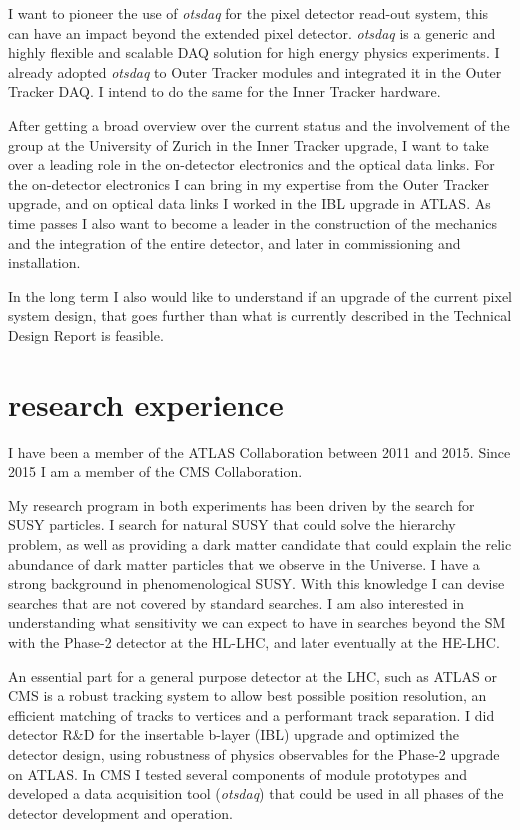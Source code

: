 \documentclass[]{cv} %
\begin{document}
\begin{statement}
I want to pioneer the use of \textit{otsdaq} for the pixel detector read-out
system, this can have an impact beyond the extended pixel detector.
\textit{otsdaq} is a generic and highly flexible and scalable DAQ solution for
high energy physics experiments. I already adopted \textit{otsdaq} to Outer
Tracker modules and integrated it in the Outer Tracker DAQ. I intend to do the
same for the Inner Tracker hardware.

After getting a broad overview over the current status and the involvement of
the group at the University of Zurich in the Inner Tracker upgrade, I want to
take over a leading role in the on-detector electronics and the optical data
links. For the on-detector electronics I can bring in my expertise from the
Outer Tracker upgrade, and on optical data links I worked in the IBL upgrade in
ATLAS. As time passes I also want to become a leader in the construction of the
mechanics and the integration of the entire detector, and later in commissioning
and installation.

In the long term I also would like to understand if an upgrade of the current
pixel system design, that goes further than what is currently described in the
Technical Design Report is feasible.

\section{research experience}

I have been a member of the ATLAS Collaboration between 2011 and 2015. Since
2015 I am a member of the CMS Collaboration.

My research program in both experiments has been driven by the search for SUSY
particles. I search for natural SUSY that could solve the hierarchy problem, as
well as providing a dark matter candidate that could explain the relic abundance
of dark matter particles that we observe in the Universe. I have a strong
background in phenomenological SUSY. With this knowledge I can devise searches
that are not covered by standard searches. I am also interested in understanding
what sensitivity we can expect to have in searches beyond the SM with the
Phase-2 detector at the HL-LHC, and later eventually at the HE-LHC.

An essential part for a general purpose detector at the LHC, such as ATLAS or
CMS is a robust tracking system to allow best possible position resolution, an
efficient matching of tracks to vertices and a performant track separation. I
did detector R\&D for the insertable b-layer (IBL) upgrade and optimized the
detector design, using robustness of physics observables for the Phase-2 upgrade
on ATLAS. In CMS I tested several components of module prototypes and developed
a data acquisition tool (\textit{otsdaq}) that could be used in all phases of the
detector development and operation.


\end{statement}
\end{document}
